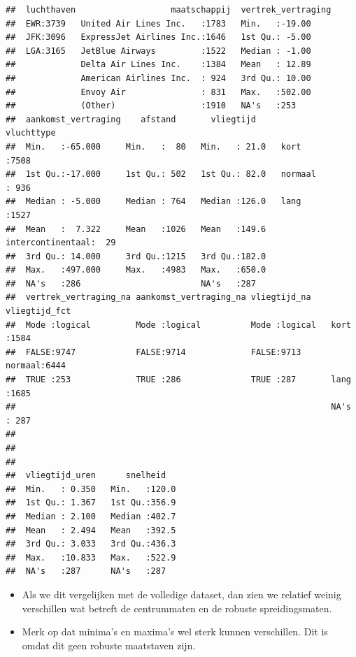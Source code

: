 \documentclass[]{tufte-book}
\providecommand{\tightlist}{%
  \setlength{\itemsep}{0pt}\setlength{\parskip}{0pt}}
\begin{document}
\begin{verbatim}
##  luchthaven                   maatschappij  vertrek_vertraging
##  EWR:3739   United Air Lines Inc.   :1783   Min.   :-19.00    
##  JFK:3096   ExpressJet Airlines Inc.:1646   1st Qu.: -5.00    
##  LGA:3165   JetBlue Airways         :1522   Median : -1.00    
##             Delta Air Lines Inc.    :1384   Mean   : 12.89    
##             American Airlines Inc.  : 924   3rd Qu.: 10.00    
##             Envoy Air               : 831   Max.   :502.00    
##             (Other)                 :1910   NA's   :253       
##  aankomst_vertraging    afstand       vliegtijd                 vluchttype  
##  Min.   :-65.000     Min.   :  80   Min.   : 21.0   kort             :7508  
##  1st Qu.:-17.000     1st Qu.: 502   1st Qu.: 82.0   normaal          : 936  
##  Median : -5.000     Median : 764   Median :126.0   lang             :1527  
##  Mean   :  7.322     Mean   :1026   Mean   :149.6   intercontinentaal:  29  
##  3rd Qu.: 14.000     3rd Qu.:1215   3rd Qu.:182.0                           
##  Max.   :497.000     Max.   :4983   Max.   :650.0                           
##  NA's   :286                        NA's   :287                             
##  vertrek_vertraging_na aankomst_vertraging_na vliegtijd_na    vliegtijd_fct 
##  Mode :logical         Mode :logical          Mode :logical   kort   :1584  
##  FALSE:9747            FALSE:9714             FALSE:9713      normaal:6444  
##  TRUE :253             TRUE :286              TRUE :287       lang   :1685  
##                                                               NA's   : 287  
##                                                                             
##                                                                             
##                                                                             
##  vliegtijd_uren      snelheid    
##  Min.   : 0.350   Min.   :120.0  
##  1st Qu.: 1.367   1st Qu.:356.9  
##  Median : 2.100   Median :402.7  
##  Mean   : 2.494   Mean   :392.5  
##  3rd Qu.: 3.033   3rd Qu.:436.3  
##  Max.   :10.833   Max.   :522.9  
##  NA's   :287      NA's   :287
\end{verbatim}

\begin{itemize}
\tightlist
\item
  Als we dit vergelijken met de volledige dataset, dan zien we relatief weinig verschillen wat betreft de centrummaten en de robuste spreidingsmaten.
\item
  Merk op dat minima's en maxima's wel sterk kunnen verschillen. Dit is omdat dit geen robuste maatstaven zijn.
\end{itemize}
\end{document}
